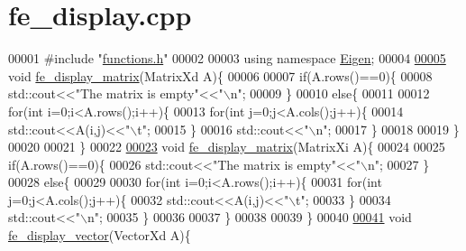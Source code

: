 \hypertarget{fe__display_8cpp_source}{}\section{fe\+\_\+display.\+cpp}
\label{fe__display_8cpp_source}

\begin{DoxyCode}
00001 \textcolor{preprocessor}{#include "\hyperlink{functions_8h}{functions.h}"}
00002 
00003 \textcolor{keyword}{using namespace }\hyperlink{namespace_eigen}{Eigen};
00004 
\hyperlink{fe__display_8cpp_a5110a192d089c6b26744b9e9d67a7c2d}{00005} \textcolor{keywordtype}{void} \hyperlink{fe__display_8cpp_a5110a192d089c6b26744b9e9d67a7c2d}{fe\_display\_matrix}(MatrixXd A)\{
00006 
00007     \textcolor{keywordflow}{if}(A.rows()==0)\{
00008         std::cout<<\textcolor{stringliteral}{"The matrix is empty"}<<\textcolor{stringliteral}{"\(\backslash\)n"};
00009     \}
00010     \textcolor{keywordflow}{else}\{
00011 
00012         \textcolor{keywordflow}{for}(\textcolor{keywordtype}{int} i=0;i<A.rows();i++)\{
00013             \textcolor{keywordflow}{for}(\textcolor{keywordtype}{int} j=0;j<A.cols();j++)\{
00014                 std::cout<<A(i,j)<<\textcolor{stringliteral}{"\(\backslash\)t"};
00015             \}
00016             std::cout<<\textcolor{stringliteral}{"\(\backslash\)n"};
00017         \}
00018 
00019     \}
00020 
00021 \}
00022 
\hyperlink{fe__display_8cpp_a2e0512443d9c47ab1f88736c8fd00c8c}{00023} \textcolor{keywordtype}{void} \hyperlink{fe__display_8cpp_a5110a192d089c6b26744b9e9d67a7c2d}{fe\_display\_matrix}(MatrixXi A)\{
00024 
00025     \textcolor{keywordflow}{if}(A.rows()==0)\{
00026         std::cout<<\textcolor{stringliteral}{"The matrix is empty"}<<\textcolor{stringliteral}{"\(\backslash\)n"};
00027     \}
00028     \textcolor{keywordflow}{else}\{
00029 
00030         \textcolor{keywordflow}{for}(\textcolor{keywordtype}{int} i=0;i<A.rows();i++)\{
00031             \textcolor{keywordflow}{for}(\textcolor{keywordtype}{int} j=0;j<A.cols();j++)\{
00032                 std::cout<<A(i,j)<<\textcolor{stringliteral}{"\(\backslash\)t"};
00033             \}
00034             std::cout<<\textcolor{stringliteral}{"\(\backslash\)n"};
00035         \}
00036 
00037     \}
00038 
00039 \}
00040 
\hyperlink{fe__display_8cpp_ab3e39c6d01b6fd10c9e264731cef75dc}{00041} \textcolor{keywordtype}{void} \hyperlink{fe__display_8cpp_ab3e39c6d01b6fd10c9e264731cef75dc}{fe\_display\_vector}(VectorXd A)\{

\end{DoxyCode}
